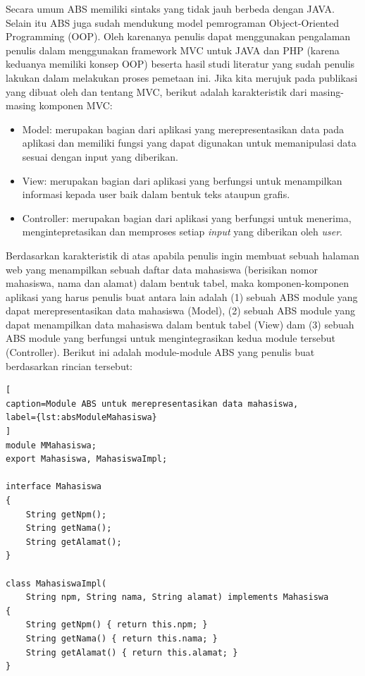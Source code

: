 Secara umum ABS memiliki sintaks yang tidak jauh berbeda dengan JAVA. Selain itu ABS juga sudah mendukung model pemrograman Object-Oriented Programming (OOP). Oleh karenanya penulis dapat menggunakan pengalaman penulis dalam menggunakan framework MVC untuk JAVA dan PHP (karena keduanya memiliki konsep OOP) beserta hasil studi literatur yang sudah penulis lakukan dalam melakukan proses pemetaan ini. Jika kita merujuk pada publikasi yang dibuat oleh \cite{krasner1988desc} dan \cite{leff2001web} tentang MVC, berikut adalah karakteristik dari masing-masing komponen MVC:

\begin{itemize}
    \item Model: merupakan bagian dari aplikasi yang merepresentasikan data pada aplikasi dan memiliki fungsi yang dapat digunakan untuk memanipulasi data sesuai dengan input yang diberikan.
    \item View: merupakan bagian dari aplikasi yang berfungsi untuk menampilkan informasi kepada user baik dalam bentuk teks ataupun grafis.
    \item Controller: merupakan bagian dari aplikasi yang berfungsi untuk menerima, mengintepretasikan dan memproses setiap \textit{input} yang diberikan oleh \textit{user}.
\end{itemize}

Berdasarkan karakteristik di atas apabila penulis ingin membuat sebuah halaman web yang menampilkan sebuah daftar data mahasiswa (berisikan nomor mahasiswa, nama dan alamat) dalam bentuk tabel, maka komponen-komponen aplikasi yang harus penulis buat antara lain adalah (1) sebuah ABS module yang dapat merepresentasikan data mahasiswa (Model), (2) sebuah ABS module yang dapat menampilkan data mahasiswa dalam bentuk tabel (View) dam (3) sebuah ABS module yang berfungsi untuk mengintegrasikan kedua module tersebut (Controller). Berikut ini adalah module-module ABS yang penulis buat berdasarkan rincian tersebut:

\begin{lstlisting}[
caption=Module ABS untuk merepresentasikan data mahasiswa,
label={lst:absModuleMahasiswa}
]
module MMahasiswa;
export Mahasiswa, MahasiswaImpl;

interface Mahasiswa
{
	String getNpm();
	String getNama();
	String getAlamat();
}

class MahasiswaImpl(
	String npm, String nama, String alamat) implements Mahasiswa
{
	String getNpm() { return this.npm; }
	String getNama() { return this.nama; }
	String getAlamat() { return this.alamat; }
}
\end{lstlisting}

